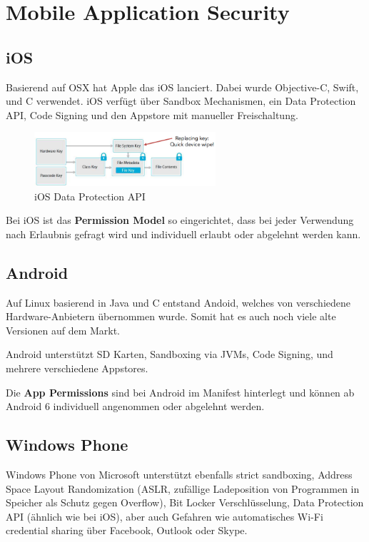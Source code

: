 \section{Mobile Application Security}

\subsection{iOS}
Basierend auf OSX hat Apple das iOS lanciert. Dabei wurde Objective-C, Swift, und C verwendet. iOS verfügt über Sandbox Mechanismen, ein Data Protection API, Code Signing und den Appstore mit manueller Freischaltung.

\begin{figure}[H]
	\centering
	\includegraphics[width=0.6\textwidth]{./img/mobileappsecurity_iOS-DataProtectionAPI}
	\caption{iOS Data Protection API}
\end{figure}

Bei iOS ist das \textbf{Permission Model} so eingerichtet, dass bei jeder Verwendung nach Erlaubnis gefragt wird und individuell erlaubt oder abgelehnt werden kann.

\subsection{Android}
Auf Linux basierend in Java und C entstand Andoid, welches von verschiedene Hardware-Anbietern übernommen wurde. Somit hat es auch noch viele alte Versionen auf dem Markt.

Android unterstützt SD Karten, Sandboxing via JVMs, Code Signing, und mehrere verschiedene Appstores.

Die \textbf{App Permissions} sind bei Android im Manifest hinterlegt und können ab Android 6 individuell angenommen oder abgelehnt werden.

\subsection{Windows Phone}
Windows Phone von Microsoft unterstützt ebenfalls strict sandboxing, Address Space Layout Randomization (ASLR, zufällige Ladeposition von Programmen in Speicher als Schutz gegen Overflow), Bit Locker Verschlüsselung, Data Protection API (ähnlich wie bei iOS), aber auch Gefahren wie automatisches Wi-Fi credential sharing über Facebook, Outlook oder Skype.

